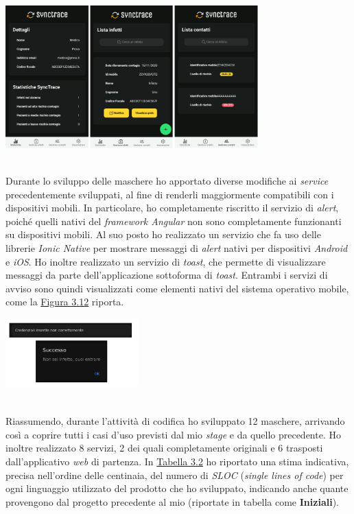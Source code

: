 \begin{minipage}{\linewidth}
  \label{img:med}
  \centering
    \includegraphics[height=5.5cm]{immagini/app/med}
\end{minipage}\\

Durante lo sviluppo delle maschere ho apportato diverse modifiche ai \textit{service} precedentemente sviluppati, al fine di renderli maggiormente compatibili con i dispositivi mobili. In particolare, ho completamente riscritto il servizio di \textit{alert}, poiché quelli nativi del \textit{framework Angular} non sono completamente funzionanti su dispositivi mobili. Al suo posto ho realizzato un servizio che fa uso delle librerie \textit{Ionic Native} per mostrare messaggi di \textit{alert} nativi per dispositivi \textit{Android} e \textit{iOS}. Ho inoltre realizzato un servizio di \textit{toast}, che permette di visualizzare messaggi da parte dell'applicazione sottoforma di \textit{toast}. Entrambi i servizi di avviso sono quindi visualizzati come elementi nativi del sistema operativo mobile, come la \hyperref[img:alert]{Figura 3.12} riporta. \\

\begin{minipage}{\linewidth}
  \label{img:alert}
  \centering
    \includegraphics[height=2.7cm]{immagini/app/alert}
\end{minipage} \\

Riassumendo, durante l'attività di codifica ho sviluppato 12 maschere, arrivando così a coprire tutti i casi d'uso previsti dal mio \textit{stage} e da quello precedente. Ho inoltre realizzato 8 servizi, 2 dei quali completamente originali e 6 trasposti dall'applicativo \textit{web} di partenza. In \hyperref[tab:sloc]{Tabella 3.2} ho riportato una stima indicativa, precisa nell'ordine delle centinaia, del numero di \textit{SLOC} (\textit{single lines of code}) per ogni linguaggio utilizzato del prodotto che ho sviluppato, indicando anche quante provengono dal progetto precedente al mio (riportate in tabella come \textbf{Iniziali}).

